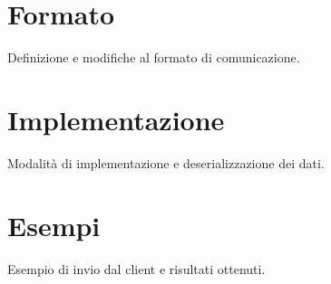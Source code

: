\section{Formato}
Definizione e modifiche al formato di comunicazione.
\section{Implementazione}
Modalità di implementazione e deserializzazione dei dati.
\section{Esempi}
Esempio di invio dal client e risultati ottenuti.